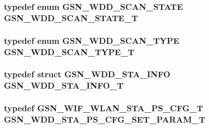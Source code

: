 \hypertarget{a00603_a940af0328a2568d0750d618f5c8f141e}{
\subsubsection[{GSN\_\-WDD\_\-SCAN\_\-STATE\_\-T}]{\setlength{\rightskip}{0pt plus 5cm}typedef enum {\bf GSN\_\-WDD\_\-SCAN\_\-STATE} {\bf GSN\_\-WDD\_\-SCAN\_\-STATE\_\-T}}}
\label{a00603_a940af0328a2568d0750d618f5c8f141e}
\hypertarget{a00603_a466b998274f9dcd29e5e82e2f28904b9}{
\subsubsection[{GSN\_\-WDD\_\-SCAN\_\-TYPE\_\-T}]{\setlength{\rightskip}{0pt plus 5cm}typedef enum {\bf GSN\_\-WDD\_\-SCAN\_\-TYPE} {\bf GSN\_\-WDD\_\-SCAN\_\-TYPE\_\-T}}}
\label{a00603_a466b998274f9dcd29e5e82e2f28904b9}
\hypertarget{a00603_affc6d455eb246fbebdf2993828a937ed}{
\subsubsection[{GSN\_\-WDD\_\-STA\_\-INFO\_\-T}]{\setlength{\rightskip}{0pt plus 5cm}typedef struct {\bf GSN\_\-WDD\_\-STA\_\-INFO} {\bf GSN\_\-WDD\_\-STA\_\-INFO\_\-T}}}
\label{a00603_affc6d455eb246fbebdf2993828a937ed}
\hypertarget{a00603_aaebb85d67e7b45db59b7608cc1ac8ad0}{
\subsubsection[{GSN\_\-WDD\_\-STA\_\-PS\_\-CFG\_\-SET\_\-PARAM\_\-T}]{\setlength{\rightskip}{0pt plus 5cm}typedef {\bf GSN\_\-WIF\_\-WLAN\_\-STA\_\-PS\_\-CFG\_\-T} {\bf GSN\_\-WDD\_\-STA\_\-PS\_\-CFG\_\-SET\_\-PARAM\_\-T}}}
\label{a00603_aaebb85d67e7b45db59b7608cc1ac8ad0}


